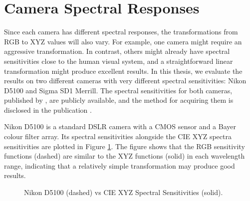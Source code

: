 \section{Camera Spectral Responses}

Since each camera has different spectral responses, the transformations from RGB to XYZ values will also vary. For example, one camera might require an aggressive transformation. In contrast, others might already have spectral sensitivities close to the human visual system, and a straightforward linear transformation might produce excellent results. In this thesis, we evaluate the results on two different cameras with very different spectral sensitivities: Nikon D5100 and Sigma SD1 Merrill. The spectral sensitivities for both cameras, published by \citeauthor{D5100NPL}, are publicly available, and the method for acquiring them is disclosed in the publication \cite{D5100NPL}.

Nikon D5100 is a standard DSLR camera with a CMOS sensor and a Bayer colour filter array. Its spectral sensitivities alongside the CIE XYZ spectra sensitivities are plotted in Figure \ref{fig:nikonvscmfs}. The figure shows that the RGB sensitivity functions (dashed) are similar to the XYZ functions (solid) in each wavelength range, indicating that a relatively simple transformation may produce good results.

\begin{figure}
    \centering
    \caption{Nikon D5100 \cite{D5100NPL} (dashed) vs CIE XYZ \cite{cie1931} Spectral Sensitivities (solid).}
    \label{fig:nikonvscmfs}
\end{figure}

